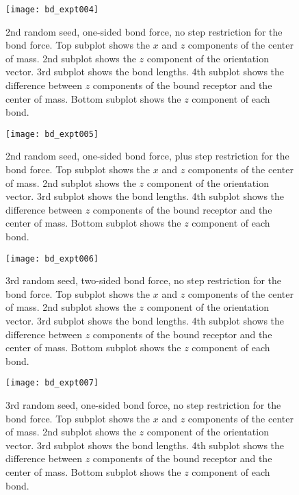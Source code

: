 \documentclass{article}
\begin{document}
\begin{figure}
  \centering
  \texttt{[image: bd\_expt004]}
  \caption{2nd random seed, one-sided bond force, no step restriction
    for the bond force. Top subplot shows the $x$ and $z$ components
    of the center of mass. 2nd subplot shows the $z$ component of the
    orientation vector. 3rd subplot shows the bond lengths. 4th
    subplot shows the difference between $z$ components of the bound
    receptor and the center of mass. Bottom subplot shows the $z$
    component of each bond.}
  \label{fig:fig5}
\end{figure}

\begin{figure}
  \centering
  \texttt{[image: bd\_expt005]}
  \caption{2nd random seed, one-sided bond force, plus step
    restriction for the bond force. Top subplot shows the $x$ and $z$
    components of the center of mass. 2nd subplot shows the $z$
    component of the orientation vector. 3rd subplot shows the bond
    lengths. 4th subplot shows the difference between $z$ components
    of the bound receptor and the center of mass. Bottom subplot shows
    the $z$ component of each bond.}
  \label{fig:fig6}
\end{figure}

\begin{figure}
  \centering
  \texttt{[image: bd\_expt006]}
  \caption{3rd random seed, two-sided bond force, no step restriction
    for the bond force. Top subplot shows the $x$ and $z$ components
    of the center of mass. 2nd subplot shows the $z$ component of the
    orientation vector. 3rd subplot shows the bond lengths. 4th
    subplot shows the difference between $z$ components of the bound
    receptor and the center of mass. Bottom subplot shows the $z$
    component of each bond.}
  \label{fig:fig7}
\end{figure}

\begin{figure}
  \centering
  \texttt{[image: bd\_expt007]}
  \caption{3rd random seed, one-sided bond force, no step restriction
    for the bond force. Top subplot shows the $x$ and $z$ components
    of the center of mass. 2nd subplot shows the $z$ component of the
    orientation vector. 3rd subplot shows the bond lengths. 4th
    subplot shows the difference between $z$ components of the bound
    receptor and the center of mass. Bottom subplot shows the $z$
    component of each bond.}
  \label{fig:fig8}
\end{figure}
\end{document}
